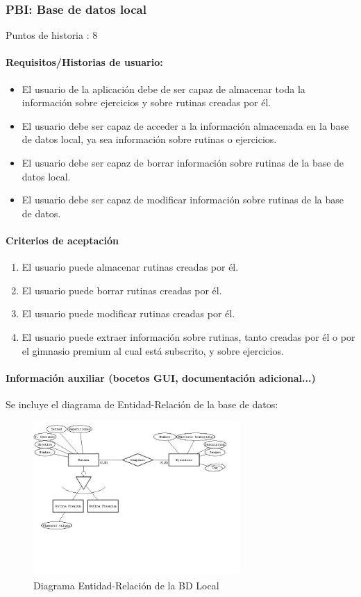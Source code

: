 \documentclass[11pt,a4paper]{report}
\begin{document}
\subsubsection{PBI: Base de datos local}
Puntos de historia : 8
\paragraph{Requisitos/Historias de usuario:}
\begin{itemize}
	\item El usuario de la aplicación debe de ser capaz de almacenar toda la información sobre ejercicios y sobre rutinas creadas por él.
	\item El usuario debe ser capaz de acceder a la información almacenada en la base de datos local, ya sea información sobre rutinas o ejercicios.
	\item El usuario debe ser capaz de borrar información sobre rutinas de la base de datos local.
	\item El usuario debe ser capaz de modificar información sobre rutinas de la base de datos.
\end{itemize}
\paragraph{Criterios de aceptación}
\begin{enumerate}
	\item El usuario puede almacenar rutinas creadas por él.
	\item El usuario puede borrar rutinas creadas por él.
	\item El usuario puede modificar rutinas creadas por él.
	\item El usuario puede extraer información sobre rutinas, tanto creadas por él o por el gimnasio premium al cual está subscrito, y sobre ejercicios.
\end{enumerate}
\paragraph{Información auxiliar (bocetos GUI, documentación adicional...)}
Se incluye el diagrama de Entidad-Relación de la base de datos:
\begin{figure}[H]
	\centering
	\includegraphics[width=0.7\textwidth]{capturicas/er.jpg}
	\caption{Diagrama Entidad-Relación de la BD Local}
	\label{fig: er}
\end{figure}
\end{document}
